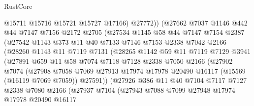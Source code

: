 \begin{lexlean}{RustCore}
\begin{coremodule}
                    @15711
                    @15716
                    @15721
                    @15727
                    @17166)
                  @27772))
              (@27662
                @7037
                @1146
                @442
                @44
                @7147
                @7156
                @2172
                @2705
                (@27534
                  @1145
                  @58
                  @44
                  @7147
                  @7154
                  @2387
                  (@27542
                    @1143
                    @373
                    @11
                    @40
                    @7133
                    @7146
                    @7153
                    @2338
                    @7042
                    @2166
                    (@28260
                      @1143
                      @11
                      @7119
                      @7131
                      (@28265
                        @1142
                        @59
                        @11
                        @7119
                        @7129
                        @3941
                        (@27891
                          @659
                          @11
                          @58
                          @7074
                          @7118
                          @7128
                          @2338
                          @7050
                          @2166
                          (@27902
                            @7074
                            (@27908
                              @7058
                              @7069
                              @27913
                              @17974
                              @17978
                              @20490
                              @16117
                              (@15569 (@16119 @7069 @7059))
                              @27591))
                          (@27926
                            @386
                            @11
                            @40
                            @7104
                            @7117
                            @7127
                            @2338
                            @7080
                            @2166
                            (@27937
                              @7104
                              (@27943
                                @7088
                                @7099
                                @27948
                                @17974
                                @17978
                                @20490
                                @16117

\end{coremodule}
\end{lexlean}

